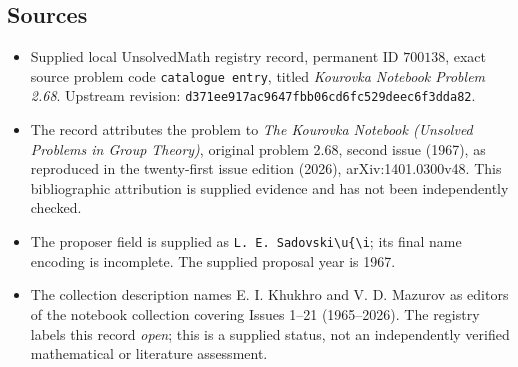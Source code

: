 \documentclass[11pt]{article}
\begin{document}
\subsection{Sources}
\begin{itemize}
\item Supplied local UnsolvedMath registry record, permanent ID \(700138\), exact source problem code \texttt{catalogue entry}, titled \emph{Kourovka Notebook Problem 2.68}. Upstream revision: \texttt{d371ee917ac9647fbb06cd6fc529deec6f3dda82}.
\item The record attributes the problem to \emph{The Kourovka Notebook (Unsolved Problems in Group Theory)}, original problem 2.68, second issue (1967), as reproduced in the twenty-first issue edition (2026), arXiv:1401.0300v48. This bibliographic attribution is supplied evidence and has not been independently checked.
\item The proposer field is supplied as \texttt{L. E. Sadovski\textbackslash{}u\{\textbackslash{}i}; its final name encoding is incomplete. The supplied proposal year is 1967.
\item The collection description names E. I. Khukhro and V. D. Mazurov as editors of the notebook collection covering Issues 1--21 (1965--2026). The registry labels this record \emph{open}; this is a supplied status, not an independently verified mathematical or literature assessment.
\end{itemize}
\end{document}
